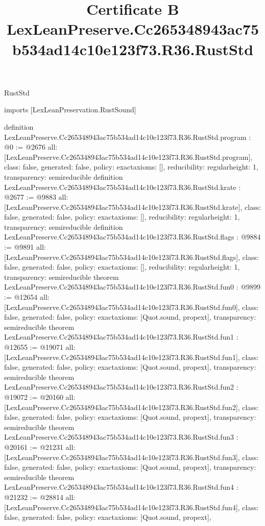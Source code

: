\begin{lexlean}{RustStd}
\title{Certificate B LexLeanPreserve.Cc265348943ac75b534ad14c10e123f73.R36.RustStd}
\begin{coremodule}
imports [LexLeanPreservation.RustSound]

definition LexLeanPreserve.Cc265348943ac75b534ad14c10e123f73.R36.RustStd.program : @0 := @2676 {
  all: [LexLeanPreserve.Cc265348943ac75b534ad14c10e123f73.R36.RustStd.program],
  class: false,
  generated: false,
  policy: exact{axioms: []},
  reducibility: regular{height: 1},
  transparency: semireducible
}
definition LexLeanPreserve.Cc265348943ac75b534ad14c10e123f73.R36.RustStd.krate : @2677 := @9883 {
  all: [LexLeanPreserve.Cc265348943ac75b534ad14c10e123f73.R36.RustStd.krate],
  class: false,
  generated: false,
  policy: exact{axioms: []},
  reducibility: regular{height: 1},
  transparency: semireducible
}
definition LexLeanPreserve.Cc265348943ac75b534ad14c10e123f73.R36.RustStd.flags : @9884 := @9891 {
  all: [LexLeanPreserve.Cc265348943ac75b534ad14c10e123f73.R36.RustStd.flags],
  class: false,
  generated: false,
  policy: exact{axioms: []},
  reducibility: regular{height: 1},
  transparency: semireducible
}
theorem LexLeanPreserve.Cc265348943ac75b534ad14c10e123f73.R36.RustStd.fun0 : @9899 := @12654 {
  all: [LexLeanPreserve.Cc265348943ac75b534ad14c10e123f73.R36.RustStd.fun0],
  class: false,
  generated: false,
  policy: exact{axioms: [Quot.sound, propext]},
  transparency: semireducible
}
theorem LexLeanPreserve.Cc265348943ac75b534ad14c10e123f73.R36.RustStd.fun1 : @12655 := @19071 {
  all: [LexLeanPreserve.Cc265348943ac75b534ad14c10e123f73.R36.RustStd.fun1],
  class: false,
  generated: false,
  policy: exact{axioms: [Quot.sound, propext]},
  transparency: semireducible
}
theorem LexLeanPreserve.Cc265348943ac75b534ad14c10e123f73.R36.RustStd.fun2 : @19072 := @20160 {
  all: [LexLeanPreserve.Cc265348943ac75b534ad14c10e123f73.R36.RustStd.fun2],
  class: false,
  generated: false,
  policy: exact{axioms: [Quot.sound, propext]},
  transparency: semireducible
}
theorem LexLeanPreserve.Cc265348943ac75b534ad14c10e123f73.R36.RustStd.fun3 : @20161 := @21231 {
  all: [LexLeanPreserve.Cc265348943ac75b534ad14c10e123f73.R36.RustStd.fun3],
  class: false,
  generated: false,
  policy: exact{axioms: [Quot.sound, propext]},
  transparency: semireducible
}
theorem LexLeanPreserve.Cc265348943ac75b534ad14c10e123f73.R36.RustStd.fun4 : @21232 := @28814 {
  all: [LexLeanPreserve.Cc265348943ac75b534ad14c10e123f73.R36.RustStd.fun4],
  class: false,
  generated: false,
  policy: exact{axioms: [Quot.sound, propext]},
}
\end{coremodule}
\end{lexlean}
